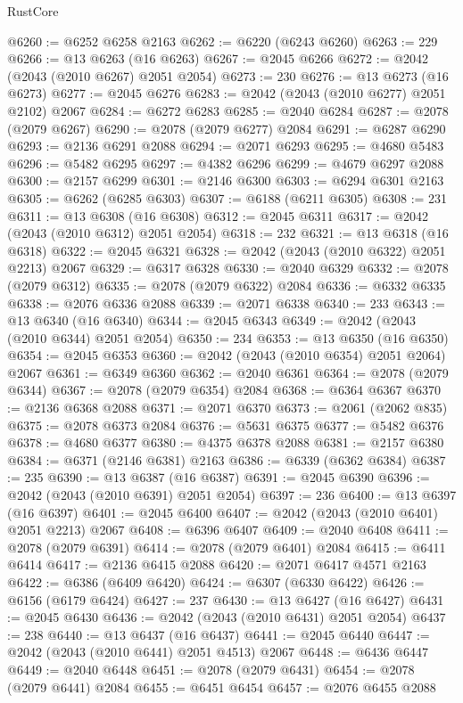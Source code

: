 \begin{lexlean}{RustCore}
\begin{coremodule}
@6260 := @6252 @6258 @2163
@6262 := @6220 (@6243 @6260)
@6263 := 229
@6266 := @13 @6263 (@16 @6263)
@6267 := @2045 @6266
@6272 := @2042 (@2043 (@2010 @6267) @2051 @2054)
@6273 := 230
@6276 := @13 @6273 (@16 @6273)
@6277 := @2045 @6276
@6283 := @2042 (@2043 (@2010 @6277) @2051 @2102) @2067
@6284 := @6272 @6283
@6285 := @2040 @6284
@6287 := @2078 (@2079 @6267)
@6290 := @2078 (@2079 @6277) @2084
@6291 := @6287 @6290
@6293 := @2136 @6291 @2088
@6294 := @2071 @6293
@6295 := @4680 @5483
@6296 := @5482 @6295
@6297 := @4382 @6296
@6299 := @4679 @6297 @2088
@6300 := @2157 @6299
@6301 := @2146 @6300
@6303 := @6294 @6301 @2163
@6305 := @6262 (@6285 @6303)
@6307 := @6188 (@6211 @6305)
@6308 := 231
@6311 := @13 @6308 (@16 @6308)
@6312 := @2045 @6311
@6317 := @2042 (@2043 (@2010 @6312) @2051 @2054)
@6318 := 232
@6321 := @13 @6318 (@16 @6318)
@6322 := @2045 @6321
@6328 := @2042 (@2043 (@2010 @6322) @2051 @2213) @2067
@6329 := @6317 @6328
@6330 := @2040 @6329
@6332 := @2078 (@2079 @6312)
@6335 := @2078 (@2079 @6322) @2084
@6336 := @6332 @6335
@6338 := @2076 @6336 @2088
@6339 := @2071 @6338
@6340 := 233
@6343 := @13 @6340 (@16 @6340)
@6344 := @2045 @6343
@6349 := @2042 (@2043 (@2010 @6344) @2051 @2054)
@6350 := 234
@6353 := @13 @6350 (@16 @6350)
@6354 := @2045 @6353
@6360 := @2042 (@2043 (@2010 @6354) @2051 @2064) @2067
@6361 := @6349 @6360
@6362 := @2040 @6361
@6364 := @2078 (@2079 @6344)
@6367 := @2078 (@2079 @6354) @2084
@6368 := @6364 @6367
@6370 := @2136 @6368 @2088
@6371 := @2071 @6370
@6373 := @2061 (@2062 @835)
@6375 := @2078 @6373 @2084
@6376 := @5631 @6375
@6377 := @5482 @6376
@6378 := @4680 @6377
@6380 := @4375 @6378 @2088
@6381 := @2157 @6380
@6384 := @6371 (@2146 @6381) @2163
@6386 := @6339 (@6362 @6384)
@6387 := 235
@6390 := @13 @6387 (@16 @6387)
@6391 := @2045 @6390
@6396 := @2042 (@2043 (@2010 @6391) @2051 @2054)
@6397 := 236
@6400 := @13 @6397 (@16 @6397)
@6401 := @2045 @6400
@6407 := @2042 (@2043 (@2010 @6401) @2051 @2213) @2067
@6408 := @6396 @6407
@6409 := @2040 @6408
@6411 := @2078 (@2079 @6391)
@6414 := @2078 (@2079 @6401) @2084
@6415 := @6411 @6414
@6417 := @2136 @6415 @2088
@6420 := @2071 @6417 @4571 @2163
@6422 := @6386 (@6409 @6420)
@6424 := @6307 (@6330 @6422)
@6426 := @6156 (@6179 @6424)
@6427 := 237
@6430 := @13 @6427 (@16 @6427)
@6431 := @2045 @6430
@6436 := @2042 (@2043 (@2010 @6431) @2051 @2054)
@6437 := 238
@6440 := @13 @6437 (@16 @6437)
@6441 := @2045 @6440
@6447 := @2042 (@2043 (@2010 @6441) @2051 @4513) @2067
@6448 := @6436 @6447
@6449 := @2040 @6448
@6451 := @2078 (@2079 @6431)
@6454 := @2078 (@2079 @6441) @2084
@6455 := @6451 @6454
@6457 := @2076 @6455 @2088

\end{coremodule}
\end{lexlean}
